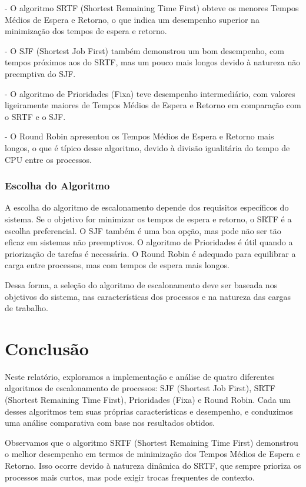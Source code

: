 \documentclass[
	12pt,				%
	openright,			%
	oneside,			%
	a4paper,			%
	chapter=TITLE,		%
	english,			%
	french,				%
	spanish,			%
	brazil				%
	]{abntex2}
\theoremstyle{definition}
\begin{document}
- O algoritmo SRTF (Shortest Remaining Time First) obteve os menores Tempos Médios de Espera e Retorno, o que indica um desempenho superior na minimização dos tempos de espera e retorno.

- O SJF (Shortest Job First) também demonstrou um bom desempenho, com tempos próximos aos do SRTF, mas um pouco mais longos devido à natureza não preemptiva do SJF.

- O algoritmo de Prioridades (Fixa) teve desempenho intermediário, com valores ligeiramente maiores de Tempos Médios de Espera e Retorno em comparação com o SRTF e o SJF.

- O Round Robin apresentou os Tempos Médios de Espera e Retorno mais longos, o que é típico desse algoritmo, devido à divisão igualitária do tempo de CPU entre os processos.

\subsection{Escolha do Algoritmo}

A escolha do algoritmo de escalonamento depende dos requisitos específicos do 
sistema. Se o objetivo for minimizar os tempos de espera e retorno, o SRTF é 
a escolha preferencial. O SJF também é uma boa opção, mas pode não ser tão 
eficaz em sistemas não preemptivos. O algoritmo de Prioridades é útil quando 
a priorização de tarefas é necessária. O Round Robin é adequado para equilibrar 
a carga entre processos, mas com tempos de espera mais longos.

Dessa forma, a seleção do algoritmo de escalonamento deve ser baseada nos 
objetivos do sistema, nas características dos processos e na natureza das 
cargas de trabalho.
    

\chapter{Conclusão}
\label{conclusao}

Neste relatório, exploramos a implementação e análise de quatro diferentes algoritmos de escalonamento de processos: SJF (Shortest Job First), SRTF (Shortest Remaining Time First), Prioridades (Fixa) e Round Robin. Cada um desses algoritmos tem suas próprias características e desempenho, e conduzimos uma análise comparativa com base nos resultados obtidos.

Observamos que o algoritmo SRTF (Shortest Remaining Time First) demonstrou o melhor desempenho em termos de minimização dos Tempos Médios de Espera e Retorno. Isso ocorre devido à natureza dinâmica do SRTF, que sempre prioriza os processos mais curtos, mas pode exigir trocas frequentes de contexto.
\end{document}

